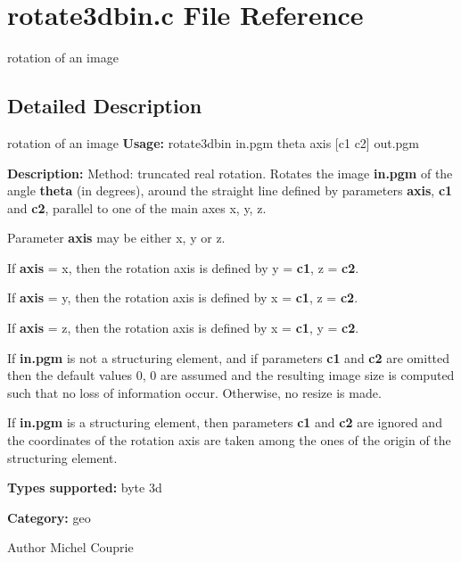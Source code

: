 \section{rotate3dbin.c File Reference}
\label{rotate3dbin_8c}


rotation of an image  




\subsection{Detailed Description}
rotation of an image {\bfseries Usage:} rotate3dbin in.pgm theta axis [c1 c2] out.pgm

{\bfseries Description:} Method: truncated real rotation. Rotates the image {\bfseries in.pgm} of the angle {\bfseries theta} (in degrees), around the straight line defined by parameters {\bfseries axis}, {\bfseries c1} and {\bfseries c2}, parallel to one of the main axes x, y, z.\par
 Parameter {\bfseries axis} may be either x, y or z.\par
 If {\bfseries axis} = x, then the rotation axis is defined by y = {\bfseries c1}, z = {\bfseries c2}.\par
 If {\bfseries axis} = y, then the rotation axis is defined by x = {\bfseries c1}, z = {\bfseries c2}.\par
 If {\bfseries axis} = z, then the rotation axis is defined by x = {\bfseries c1}, y = {\bfseries c2}.\par


If {\bfseries in.pgm} is not a structuring element, and if parameters {\bfseries c1} and {\bfseries c2} are omitted then the default values 0, 0 are assumed and the resulting image size is computed such that no loss of information occur. Otherwise, no resize is made.

If {\bfseries in.pgm} is a structuring element, then parameters {\bfseries c1} and {\bfseries c2} are ignored and the coordinates of the rotation axis are taken among the ones of the origin of the structuring element.

{\bfseries Types supported:} byte 3d

{\bfseries Category:} geo

\begin{DoxyAuthor}{Author}
Michel Couprie 
\end{DoxyAuthor}

